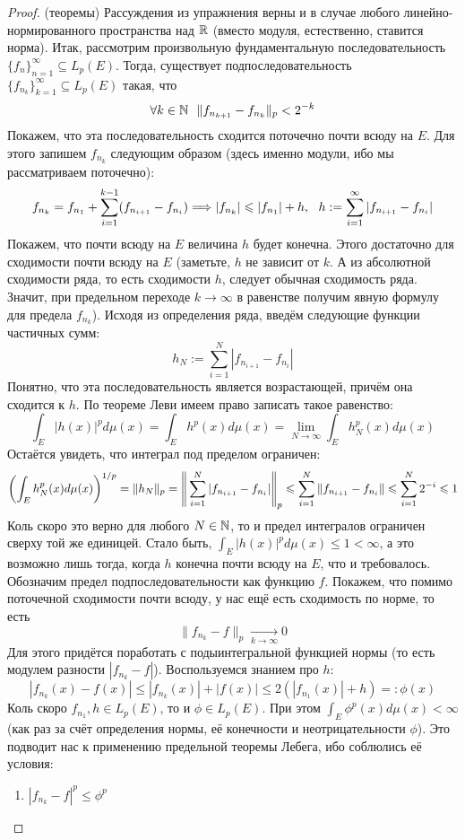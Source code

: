 \begin{proof} (теоремы)
	Рассуждения из упражнения верны и в случае любого линейно-нормированного пространства над $\mathbb{R}$ (вместо модуля, естественно, ставится норма). Итак, рассмотрим произвольную фундаментальную последовательность $\{f_n\}_{n = 1}^\infty \subseteq L_p(E)$. Тогда, существует подпоследовательность $\{f_{n_k}\}_{k = 1}^\infty \subseteq L_p(E)$ такая, что
	\[
		\forall k \in \mathbb{N}\ \ \|f_{n_{k + 1}} - f_{n_k}\|_p < 2^{-k}
	\]
	Покажем, что эта последовательность сходится поточечно почти всюду на $E$. Для этого запишем $f_{n_k}$ следующим образом (здесь именно модули, ибо мы рассматриваем поточечно):
	\[
		f_{n_k} = f_{n_1} + \sum_{i = 1}^{k - 1} (f_{n_{i + 1}} - f_{n_i}) \Longrightarrow |f_{n_k}| \leqslant |f_{n_1}| + h,\ \ h := \sum_{i = 1}^\infty |f_{n_{i + 1}} - f_{n_i}|
	\]
	Покажем, что почти всюду на $E$ величина $h$ будет конечна. Этого достаточно для сходимости почти всюду на $E$ (заметьте, $h$ не зависит от $k$. А из абсолютной сходимости ряда, то есть сходимости $h$, следует обычная сходимость ряда. Значит, при предельном переходе $k \to \infty$ в равенстве получим явную формулу для предела $f_{n_k}$). Исходя из определения ряда, введём следующие функции частичных сумм:
	\[
		h_N := \sum_{i = 1}^N |f_{n_{i + 1}} - f_{n_i}|
	\]
	Понятно, что эта последовательность является возрастающей, причём она сходится к $h$. По теореме Леви имеем право записать такое равенство:
	\[
		\int_E |h(x)|^pd\mu(x) = \int_E h^p(x)d\mu(x) = \lim_{N \to \infty} \int_E h_N^p(x)d\mu(x)
	\]
	Остаётся увидеть, что интеграл под пределом ограничен:
	\[
		\left(\int_E h_N^p(x)d\mu(x)\right)^{1 / p} = \|h_N\|_p = \Bigg\|\sum_{i = 1}^N |f_{n_{i + 1}} - f_{n_i}|\Bigg\|_p \leqslant \sum_{i = 1}^N \|f_{n_{i + 1}} - f_{n_i}\| \leqslant \sum_{i = 1}^N 2^{-i} \leqslant 1
	\]
	Коль скоро это верно для любого $N \in \mathbb{N}$, то и предел интегралов ограничен сверху той же единицей. Стало быть, $\int_E |h(x)|^pd\mu(x) \le 1 < \infty$, а это возможно лишь тогда, когда $h$ конечна почти всюду на $E$, что и требовалось. Обозначим предел подпоследовательности как функцию $f$. Покажем, что помимо поточечной сходимости почти всюду, у нас ещё есть сходимость по норме, то есть
	\[
		\|f_{n_k} - f\|_p \xrightarrow[k \to \infty]{} 0
	\]
	Для этого придётся поработать с подыинтегральной функцией нормы (то есть модулем разности $|f_{n_k} - f|$). Воспользуемся знанием про $h$:
	\[
		|f_{n_k}(x) - f(x)| \le |f_{n_k}(x)| + |f(x)| \le 2(|f_{n_1}(x)| + h) =: \phi(x)
	\]
	Коль скоро $f_{n_1}, h \in L_p(E)$, то и $\phi \in L_p(E)$. При этом $\int_E \phi^p(x)d\mu(x) < \infty$ (как раз за счёт определения нормы, её конечности и неотрицательности $\phi$). Это подводит нас к применению предельной теоремы Лебега, ибо соблюлись её условия:
	\begin{enumerate}
		\item $|f_{n_k} - f|^p \le \phi^p$
		

\end{enumerate}
\end{proof}
